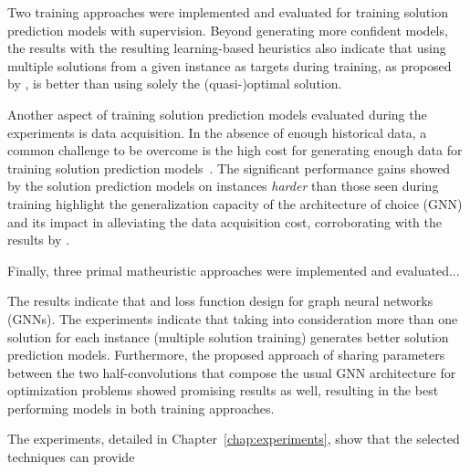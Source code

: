 Two training approaches were implemented and evaluated for training solution prediction models with supervision.
Beyond generating more confident models, the results with the resulting learning-based heuristics also indicate that using multiple solutions from a given instance as targets during training, as proposed by , is better than using solely the (quasi-)optimal solution.

Another aspect of training solution prediction models evaluated during the experiments is data acquisition.
In the absence of enough historical data, a common challenge to be overcome is the high cost for generating enough data for training solution prediction models~\cite{bengioMachineLearningCombinatorial2021,cappartCombinatorialOptimizationReasoning2022,pmlr-v119-yehuda20a}.
The significant performance gains showed by the solution prediction models on instances \emph{harder} than those seen during training highlight the generalization capacity of the architecture of choice (GNN) and its impact in alleviating the data acquisition cost, corroborating with the results by .

Finally, three primal matheuristic approaches were implemented and evaluated...



The results indicate that 
and loss function design for graph neural networks (GNNs).
The experiments indicate that taking into consideration more than one solution for each instance (multiple solution training) generates better solution prediction models.
Furthermore, the proposed approach of sharing parameters between the two half-convolutions that compose the usual GNN architecture for optimization problems showed promising results as well, resulting in the best performing models in both training approaches.

The experiments, detailed in Chapter~\ref{chap:experiments}, show that the selected techniques can provide


